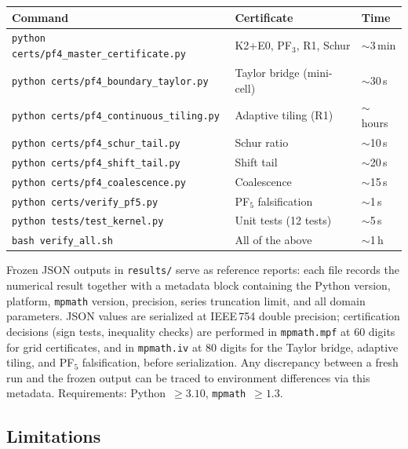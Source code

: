 \documentclass[11pt,a4paper]{amsart}
\theoremstyle{definition}
\theoremstyle{remark}
\begin{document}
\begin{center}
\begin{tabular}{@{}lll@{}}
\toprule
Command & Certificate & Time \\
\midrule
\texttt{python certs/pf4\_master\_certificate.py}  & K2+E0, PF$_3$, R1, Schur    & $\sim$3\,min \\
\texttt{python certs/pf4\_boundary\_taylor.py}     & Taylor bridge (mini-cell)    & $\sim$30\,s \\
\texttt{python certs/pf4\_continuous\_tiling.py}   & Adaptive tiling (R1)         & $\sim$hours \\
\texttt{python certs/pf4\_schur\_tail.py}          & Schur ratio                  & $\sim$10\,s \\
\texttt{python certs/pf4\_shift\_tail.py}          & Shift tail                   & $\sim$20\,s \\
\texttt{python certs/pf4\_coalescence.py}          & Coalescence                  & $\sim$15\,s \\
\texttt{python certs/verify\_pf5.py}               & PF$_5$ falsification         & $\sim$1\,s \\
\texttt{python tests/test\_kernel.py}              & Unit tests (12 tests)        & $\sim$5\,s \\
\midrule
\texttt{bash verify\_all.sh}                      & All of the above             & $\sim$1\,h \\
\bottomrule
\end{tabular}
\end{center}

Frozen JSON outputs in \texttt{results/} serve as reference
reports: each file records the numerical result together with
a metadata block containing the Python version, platform,
\texttt{mpmath} version, precision, series truncation limit,
and all domain parameters.
JSON values are serialized at IEEE\,754 double precision;
certification decisions (sign tests, inequality checks)
are performed in \texttt{mpmath.mpf} at $60$ digits for grid
certificates, and in \texttt{mpmath.iv} at $80$ digits for the
Taylor bridge, adaptive tiling, and PF$_5$ falsification,
before serialization.
Any discrepancy between a fresh run and the frozen output can
be traced to environment differences via this metadata.
Requirements: Python~$\ge 3.10$, \texttt{mpmath}~$\ge 1.3$.

\subsection{Limitations}
\end{document}
